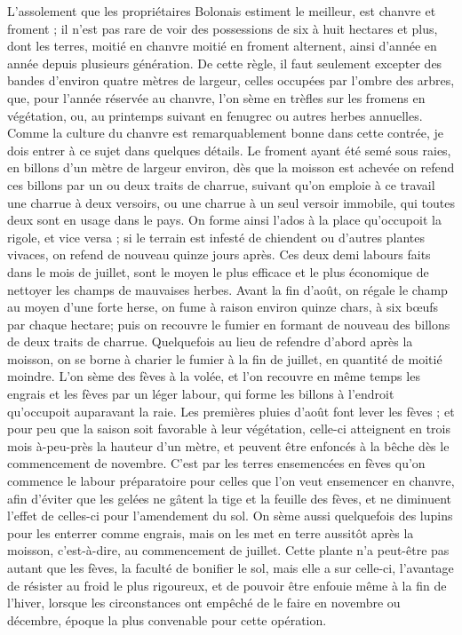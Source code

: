L’assolement que les propriétaires Bolonais estiment le meilleur, est chanvre et froment ; il n’est pas rare de voir des possessions de six à huit hectares et plus, dont les terres, moitié en chanvre moitié en froment alternent, ainsi d’année en année depuis plusieurs génération. De cette règle, il faut seulement excepter des bandes d’environ quatre mètres de largeur, celles occupées par l’ombre des arbres, que, pour l’année réservée au chanvre, l’on sème en trèfles sur les fromens en végétation, ou, au printemps suivant en fenugrec ou autres herbes annuelles. Comme la culture du chanvre est\setcounter{page}{166} remarquablement bonne dans cette contrée, je dois entrer à ce sujet dans quelques détails.
Le froment ayant été semé sous raies, en billons d'un mètre de largeur environ, dès que la moisson est achevée on refend ces billons par un ou deux traits de charrue, suivant qu'on emploie à ce travail une charrue à deux versoirs, ou une charrue à un seul versoir immobile, qui toutes deux sont en usage dans le pays. On forme ainsi l'ados à la place qu'occupoit la rigole, et vice versa ; si le terrain est infesté de chiendent ou d'autres plantes vivaces, on refend de nouveau quinze jours après. Ces deux demi labours faits dans le mois de juillet, sont le moyen le plus efficace et le plus économique de nettoyer les champs de mauvaises herbes.
Avant la fin d'août, on régale le champ au moyen d'une forte herse, on fume à raison environ quinze chars, à six bœufs par chaque hectare; puis on recouvre le fumier en formant de nouveau des billons de deux traits de charrue.
Quelquefois au lieu de refendre d'abord après la moisson, on se borne à charier le fumier à la fin de juillet, en quantité de moitié moindre. L'on sème des fèves à la\setcounter{page}{167} volée, et l'on recouvre en même temps les engrais et les fèves par un léger labour, qui forme les billons à l'endroit qu'occupoit auparavant la raie. Les premières pluies d'août font lever les fèves ; et pour peu que la saison soit favorable à leur végétation, celle-ci atteignent en trois mois à-peu-près la hauteur d'un mètre, et peuvent être enfoncés à la bêche dès le commencement de novembre. C'est par les terres ensemencées en fèves qu'on commence le labour préparatoire pour celles que l'on veut ensemencer en chanvre, afin d'éviter que les gelées ne gâtent la tige et la feuille des fèves, et ne diminuent l'effet de celles-ci pour l'amendement du sol.
On sème aussi quelquefois des lupins pour les enterrer comme engrais, mais on les met en terre aussitôt après la moisson, c'est-à-dire, au commencement de juillet. Cette plante n'a peut-être pas autant que les fèves, la faculté de bonifier le sol, mais elle a sur celle-ci, l'avantage de résister au froid le plus rigoureux, et de pouvoir être enfouie même à la fin de l'hiver, lorsque les circonstances ont empêché de le faire en novembre ou décembre, époque la plus convenable pour cette opération.
